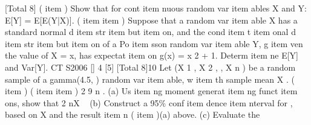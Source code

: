[Total 8]
(%
item ) Show that for cont%
item nuous random var%
item ables X and Y:
E[Y] = E[E(Y|X)].
(%
item %
item )
Suppose that a random var%
item able X has a standard normal d%
item str%
item but%
item on, and the
cond%
item t%
item onal d%
item str%
item but%
item on of a Po%
item sson random var%
item able Y, g%
item ven the value of
X = x, has expectat%
item on g(x) = x 2 + 1.
Determ%
item ne E[Y] and Var[Y].
CT S2006
[]
4
[5]
[Total 8]10
Let (X 1 , X 2 ,
, X n ) be a random sample of a gamma(4.5, ) random var%
item able, w%
item th
sample mean X .
(%
item )
(%
item %
item )
2
9 n .
(a) Us%
item ng moment generat%
item ng funct%
item ons, show that 2 nX ~
(b) Construct a 95\% conf%
item dence %
item nterval for , based on X and the result
item n (%
item )(a) above.
(c) Evaluate the %

